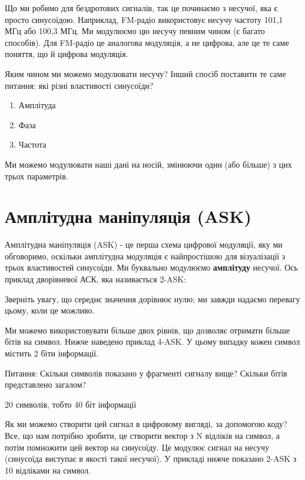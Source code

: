 \href{../_images/square-wave.svg}{}

Що ми робимо для бездротових сигналів, так це починаємо з несучої, яка є
просто синусоїдою. Наприклад, FM-радіо використовує несучу частоту 101,1
МГц або 100,3 МГц. Ми модулюємо цю несучу певним чином (є багато
способів). Для FM-радіо це аналогова модуляція, а не цифрова, але це те
саме поняття, що й цифрова модуляція.

Яким чином ми можемо модулювати несучу? Інший спосіб поставити те саме
питання: які різні властивості синусоїди?

\begin{enumerate}
\def\labelenumi{\arabic{enumi}.}
\tightlist
\item
  Амплітуда
\item
  Фаза
\item
  Частота
\end{enumerate}

Ми можемо модулювати наші дані на носій, змінюючи один (або більше) з
цих трьох параметрів.

\section{Амплітудна маніпуляція
(ASK)}\label{ux430ux43cux43fux43bux456ux442ux443ux434ux43dux430-ux43cux430ux43dux456ux43fux443ux43bux44fux446ux456ux44f-ask}

Амплітудна маніпуляція (ASK) - це перша схема цифрової модуляції, яку ми
обговоримо, оскільки амплітудна модуляція є найпростішою для
візуалізації з трьох властивостей синусоїди. Ми буквально модулюємо
\textbf{амплітуду} несучої. Ось приклад дворівневої АСК, яка називається
2-ASK:

\href{../_images/ASK.svg}{}

Зверніть увагу, що середнє значення дорівнює нулю; ми завжди надаємо
перевагу цьому, коли це можливо.

Ми можемо використовувати більше двох рівнів, що дозволяє отримати
більше бітів на символ. Нижче наведено приклад 4-ASK. У цьому випадку
кожен символ містить 2 біти інформації.

\href{../_images/ask2.svg}{}

Питання: Скільки символів показано у фрагменті сигналу вище? Скільки
бітів представлено загалом?

20 символів, тобто 40 біт інформації

Як ми можемо створити цей сигнал в цифровому вигляді, за допомогою коду?
Все, що нам потрібно зробити, це створити вектор з N відліків на символ,
а потім помножити цей вектор на синусоїду. Це модулює сигнал на несучу
(синусоїда виступає в якості такої несучої). У прикладі нижче показано
2-ASK з 10 відліками на символ.

